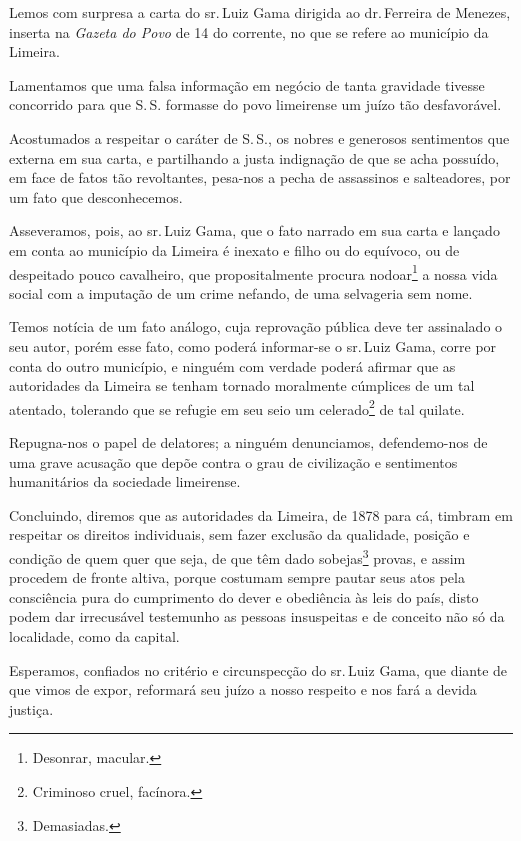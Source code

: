 Lemos com surpresa a carta do sr.\,Luiz Gama dirigida ao dr.\,Ferreira de
Menezes, inserta na \emph{Gazeta do Povo} de 14 do corrente, no que se
refere ao município da Limeira.

Lamentamos que uma falsa informação em negócio de tanta gravidade
tivesse concorrido para que S.\,S. formasse do povo limeirense um juízo
tão desfavorável.

Acostumados a respeitar o caráter de S.\,S., os nobres e generosos
sentimentos que externa em sua carta, e partilhando a justa indignação
de que se acha possuído, em face de fatos tão revoltantes,
pesa-nos a pecha de assassinos e salteadores, por um fato que
desconhecemos.

Asseveramos, pois, ao sr.\,Luiz Gama, que o fato narrado em sua carta e
lançado em conta ao município da Limeira é inexato e filho ou do
equívoco, ou de despeitado pouco cavalheiro, que propositalmente procura
nodoar\footnote{Desonrar, macular.} a nossa vida social com a
imputação de um crime nefando, de uma selvageria sem nome.

Temos notícia de um fato análogo, cuja reprovação pública deve ter
assinalado o seu autor, porém esse fato, como poderá informar-se o sr.\,Luiz Gama, corre por conta do outro município, e ninguém com verdade
poderá afirmar que as autoridades da Limeira se tenham tornado
moralmente cúmplices de um tal atentado, tolerando que se refugie em seu
seio um celerado\footnote{Criminoso cruel, facínora.} de tal quilate.

Repugna-nos o papel de delatores; a ninguém denunciamos, defendemo-nos
de uma grave acusação que depõe contra o grau de civilização e
sentimentos humanitários da sociedade limeirense.

Concluindo, diremos que as autoridades da Limeira, de 1878 para cá,
timbram em respeitar os direitos individuais, sem fazer exclusão da
qualidade, posição e condição de quem quer que seja, de que têm dado
sobejas\footnote{Demasiadas.} provas, e assim procedem de fronte
altiva, porque costumam sempre pautar seus atos pela consciência pura do
cumprimento do dever e obediência às leis do país, disto podem dar
irrecusável testemunho as pessoas insuspeitas e de conceito não só da
localidade, como da capital.

Esperamos, confiados no critério e circunspecção do sr.\,Luiz Gama, que
diante de que vimos de expor, reformará seu juízo a nosso respeito e nos
fará a devida justiça.

